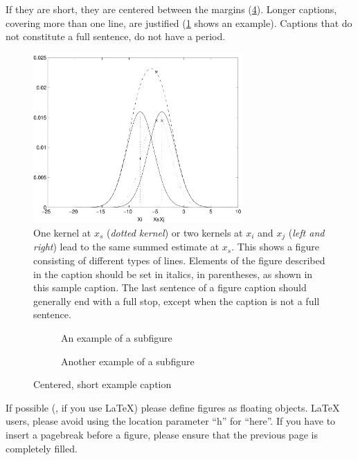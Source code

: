 \documentclass[runningheads]{llncs}
\begin{document}
If they are short, they are centered between the margins (\cf \cref{fig:short}). 
Longer captions, covering more than one line, are justified (\cref{fig:example} shows an example). 
Captions that do not constitute a full sentence, do not have a period.


\begin{figure}[tb]
  \centering
  \includegraphics[height=6.5cm]{eijkel2}
  \caption{One kernel at $x_s$ (\emph{dotted kernel}) or two kernels at $x_i$ and $x_j$ (\emph{left and right}) lead to the same summed estimate at $x_s$.
    This shows a figure consisting of different types of lines.
    Elements of the figure described in the caption should be set in italics, in parentheses, as shown in this sample caption. 
    The last sentence of a figure caption should generally end with a full stop, except when the caption is not a full sentence.
  }
  \label{fig:example}
\end{figure}

\begin{figure}[tb]
  \centering
  \begin{subfigure}{0.68\linewidth}
    \fbox{\rule{0pt}{0.5in} \rule{.9\linewidth}{0pt}}
    \caption{An example of a subfigure}
    \label{fig:short-a}
  \end{subfigure}
  \hfill
  \begin{subfigure}{0.28\linewidth}
    \fbox{\rule{0pt}{0.5in} \rule{.9\linewidth}{0pt}}
    \caption{Another example of a subfigure}
    \label{fig:short-b}
  \end{subfigure}
  \caption{Centered, short example caption}
  \label{fig:short}
\end{figure}

If possible (\eg, if you use \LaTeX) please define figures as floating objects. 
\LaTeX{} users, please avoid using the location parameter ``h'' for ``here''. 
If you have to insert a pagebreak before a figure, please ensure that the previous page is completely filled.
\end{document}
